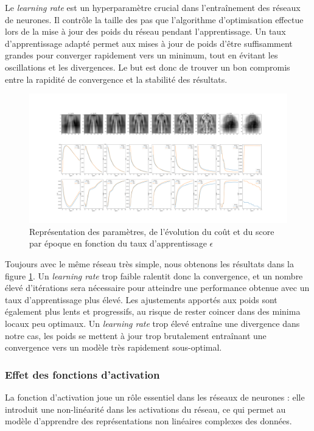 \documentclass{article}
\begin{document}
Le \textit{learning rate} est un hyperparamètre crucial dans l'entraînement des réseaux de neurones. Il contrôle la taille des pas que l'algorithme d'optimisation effectue lors de la mise à jour des poids du réseau pendant l'apprentissage. Un taux d'apprentissage adapté permet aux mises à jour de poids d'être suffisamment grandes pour converger rapidement vers un minimum, tout en évitant les oscillations et les divergences. Le but est donc de trouver un bon compromis entre la rapidité de convergence et la stabilité des résultats.

\begin{figure}[htbp]
    \centering
    \includegraphics[width=\textwidth]{lr_effet.pdf}
    \caption{Représentation des paramètres, de l'évolution du coût et du score par époque en fonction du taux d'apprentissage $ \epsilon $}
    \label{fig:effetlearningrate}
\end{figure}

Toujours avec le même réseau très simple, nous obtenons les résultats dans la figure \ref{fig:effetlearningrate}. Un \textit{learning rate} trop faible ralentit donc la convergence, et un nombre élevé d'itérations sera nécessaire pour atteindre une performance obtenue avec un taux d'apprentissage plus élevé. Les ajustements apportés aux poids sont également plus lents et progressifs, au risque de rester coincer dans des minima locaux peu optimaux. Un \textit{learning rate} trop élevé entraîne une divergence dans notre cas, les poids se mettent à jour trop brutalement entraînant une convergence vers un modèle très rapidement sous-optimal.

\subsubsection{Effet des fonctions d'activation}

La fonction d'activation joue un rôle essentiel dans les réseaux de neurones : elle introduit une non-linéarité dans les activations du réseau, ce qui permet au modèle d'apprendre des représentations non linéaires complexes des données.
\end{document}
